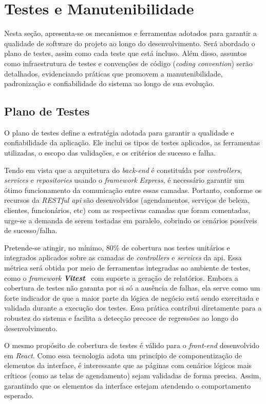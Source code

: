 \section{Testes e Manutenibilidade}
Nesta seção, apresenta-se os mecanismos e ferramentas adotados para garantir a qualidade de software do projeto ao longo do desenvolvimento.
Será abordado o plano de testes, assim como cada teste que está incluso. Além disso, assuntos como infraestrutura de testes e convenções de código (\textit{coding convention})
serão detalhados, evidenciando práticas que promovem a manutenibilidade, padronização e confiabilidade do sistema ao longo de sua evolução.

\subsection{Plano de Testes}
O plano de testes define a estratégia adotada para garantir a qualidade e confiabilidade da aplicação. 
Ele inclui os tipos de testes aplicados, as ferramentas utilizadas, o escopo das validações, e os critérios de sucesso e falha.

Tendo em vista que a arquitetura do \textit{back-end} é constituída por \textit{controllers}, \textit{services} e \textit{repositories} usando o \emph{framework} \textit{Express}, 
é necessário garantir um ótimo funcionamento da comunicação entre essas camadas. Portanto, conforme os recursos da \textit{RESTful \gls{api}} são desenvolvidos (agendamentos, serviços de beleza, clientes, funcionários, etc) com as respectivas camadas que foram comentadas, urge-se a demanda de serem testadas em paralelo, cobrindo os cenários possíveis de sucesso/falha. 

Pretende-se atingir, no mínimo, 80\% de cobertura nos testes unitários e integrados aplicados sobre as camadas de \textit{controllers} e \textit{services} da \gls{api}. Essa métrica será obtida por meio de ferramentas integradas ao ambiente de testes, como o \textit{framework} \textbf{\textit{Vitest}}~\cite{vitest-2025} com suporte a geração de relatórios. Embora a cobertura de testes não garanta por si só a ausência de falhas, ela serve como um forte indicador de que a maior parte da lógica de negócio está sendo exercitada e validada durante a execução dos testes. Essa prática contribui diretamente para a robustez do sistema e facilita a detecção precoce de regressões ao longo do desenvolvimento.

O mesmo propósito de cobertura de testes é válido para o \textit{front-end} desenvolvido em \textit{React}. Como essa tecnologia adota um princípio de componentização de elementos da interface,
é interessante que as páginas com cenários lógicos mais críticos (como as telas de agendamento) sejam validadas de forma precisa. Assim, garantindo que os elementos da interface estejam atendendo o comportamento esperado.

